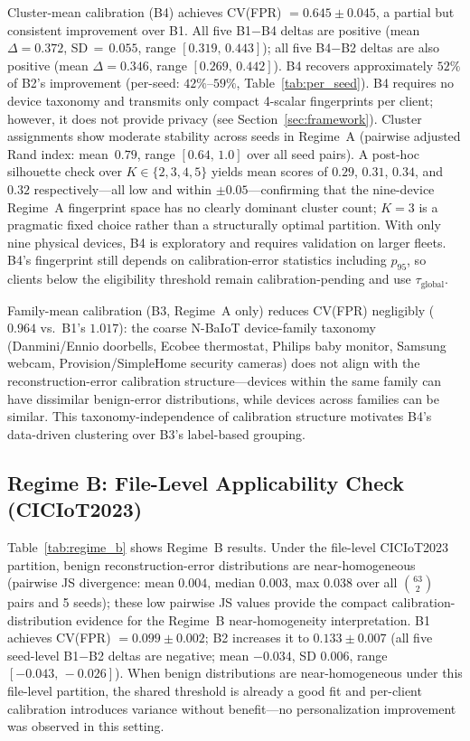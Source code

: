 Cluster-mean calibration (B4) achieves CV(FPR) $= 0.645 \pm 0.045$, a partial but consistent improvement over B1.
All five B1$-$B4 deltas are positive (mean $\Delta=0.372$, SD$\,{=}\,0.055$, range $[0.319,\,0.443]$);
all five B4$-$B2 deltas are also positive (mean $\Delta=0.346$, range $[0.269,\,0.442]$).
B4 recovers approximately $52\%$ of B2's improvement (per-seed: $42\%$--$59\%$, Table~\ref{tab:per_seed}).
B4 requires no device taxonomy and transmits only compact 4-scalar fingerprints per client;
however, it does not provide privacy (see Section~\ref{sec:framework}).
Cluster assignments show moderate stability across seeds in Regime~A
(pairwise adjusted Rand index: mean~$0.79$, range $[0.64,\,1.0]$ over all seed pairs).
A post-hoc silhouette check over $K \in \{2,3,4,5\}$ yields mean scores of
$0.29$, $0.31$, $0.34$, and $0.32$ respectively---all low and within $\pm 0.05$---confirming
that the nine-device Regime~A fingerprint space has no clearly dominant cluster count;
$K{=}3$ is a pragmatic fixed choice rather than a structurally optimal partition.
With only nine physical devices, B4 is exploratory and requires validation on larger fleets.
B4's fingerprint still depends on calibration-error statistics including $p_{95}$, so
clients below the eligibility threshold remain calibration-pending and use
$\tau_{\text{global}}$.

Family-mean calibration (B3, Regime~A only) reduces CV(FPR) negligibly
($0.964$ vs.\ B1's $1.017$): the coarse N-BaIoT device-family taxonomy
(Danmini/Ennio doorbells, Ecobee thermostat, Philips baby monitor, Samsung webcam,
Provision/SimpleHome security cameras) does not align with the reconstruction-error
calibration structure---devices within the same family can have dissimilar
benign-error distributions, while devices across families can be similar.
This taxonomy-independence of calibration structure motivates B4's data-driven clustering
over B3's label-based grouping.

\subsection{Regime B: File-Level Applicability Check (CICIoT2023)}

Table~\ref{tab:regime_b} shows Regime~B results.
Under the file-level CICIoT2023 partition, benign reconstruction-error distributions are
near-homogeneous (pairwise JS divergence: mean $0.004$, median $0.003$, max $0.038$
over all $\binom{63}{2}$ pairs and 5 seeds); these low pairwise JS values provide the compact calibration-distribution evidence for the Regime~B near-homogeneity interpretation.
B1 achieves CV(FPR) $= 0.099 \pm 0.002$; B2 increases it to $0.133 \pm 0.007$
(all five seed-level B1$-$B2 deltas are negative; mean $-0.034$, SD $0.006$, range $[-0.043,\,-0.026]$).
When benign distributions are near-homogeneous under this file-level partition, the shared
threshold is already a good fit and per-client calibration introduces variance without
benefit---no personalization improvement was observed in this setting.

